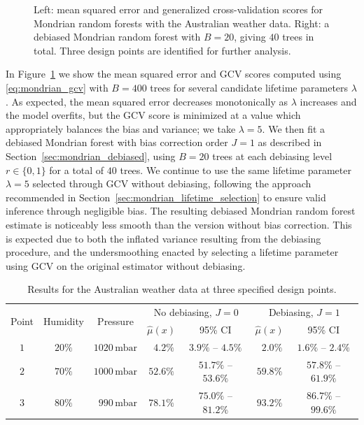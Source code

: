 \begin{figure}[t]
\begin{subfigure}{0.49\textwidth}
  \end{subfigure}
  \caption[Cross-validation and debiasing for the Australian weather data]{
    Left: mean squared error and generalized cross-validation scores
    for Mondrian random forests with the Australian weather data.
    Right: a debiased Mondrian random forest with $B=20$, giving $40$ trees
  in total. Three design points are identified for further analysis.}
  \label{fig:mondrian_weather_gcv}
\end{figure}

In Figure~\ref{fig:mondrian_weather_gcv} we show the mean squared error and GCV
scores
computed using \eqref{eq:mondrian_gcv} with $B=400$ trees
for several candidate lifetime parameters $\lambda$. As
expected, the mean squared error decreases monotonically
as $\lambda$ increases and the model
overfits, but the GCV score is minimized at a value which appropriately
balances the bias and variance; we take $\lambda = 5$.
We then fit a debiased Mondrian forest
with bias correction order $J = 1$ as described in
Section~\ref{sec:mondrian_debiased}, using $B=20$ trees at each debiasing level
$r \in \{0, 1\}$ for a total of $40$ trees.
We continue to use the same lifetime parameter
$\lambda = 5$ selected through GCV without debiasing, following the approach
recommended in Section~\ref{sec:mondrian_lifetime_selection} to ensure valid
inference
through negligible bias.
The resulting debiased Mondrian random forest estimate is noticeably
less smooth than the version without bias correction.
This is expected due to both the inflated variance resulting from the debiasing
procedure, and the undersmoothing enacted by selecting a lifetime parameter
using GCV on the original estimator without debiasing.

\begin{table}[b!]
  \centering
  \begin{tabular}{|c|c|c|c|c|c|c|}
    \hline
    \multirow{2}{*}{Point}
    & \multirow{2}{*}{Humidity}
    & \multirow{2}{*}{Pressure}
    & \multicolumn{2}{|c|}{No debiasing, $J=0$}
    & \multicolumn{2}{|c|}{Debiasing, $J=1$} \\
    \cline{4-7}
    & &
    & $\hat\mu(x)$ & 95\% CI
    & $\hat\mu(x)$ & 95\% CI \\
    \hline
    $1$ & $20\%$ & $1020\,\textrm{mbar}$ &
    $\phantom{0}4.2\%$ &
    $3.9\%$ -- $4.5\%$ &
    $\phantom{0}2.0\%$ &
    $1.6\%$ -- $2.4\%$ \\
    $2$ & $70\%$ & $1000\,\textrm{mbar}$ &
    $52.6\%$ &
    $51.7\%$ -- $53.6\%$ &
    $59.8\%$ &
    $57.8\%$ -- $61.9\%$ \\
    $3$ & $80\%$ & $\phantom{1}990\,\textrm{mbar}$ &
    $78.1\%$ &
    $75.0\%$ -- $81.2\%$ &
    $93.2\%$ &
    $86.7\%$ -- $99.6\%$ \\
    \hline
  \end{tabular}
  \caption[Results for the Australian weather data]{
    Results for the Australian weather data
  at three specified design points.}
  \label{tab:mondrian_weather_ci}
\end{table}

